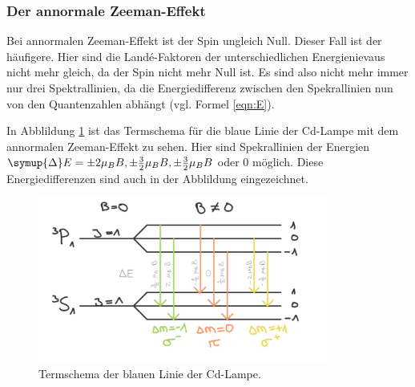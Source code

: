 \subsubsection{Der annormale Zeeman-Effekt}

Bei annormalen Zeeman-Effekt ist der Spin ungleich Null. Dieser Fall ist der häufigere.
Hier sind die Landé-Faktoren der unterschiedlichen Energienievaus nicht mehr gleich, da der Spin nicht mehr Null ist. 
Es sind also nicht mehr immer nur drei Spektrallinien, da die Energiedifferenz zwischen den 
Spekrallinien nun von den Quantenzahlen abhängt (vgl. Formel \ref{eqn:E}). 

In Abblildung \ref{fig:blau} ist das Termschema für die blaue Linie der Cd-Lampe mit dem annormalen 
Zeeman-Effekt zu sehen. Hier sind Spekrallinien der Energien $\symup{\Delta}E = \pm 2 \mu_B B, \pm \frac{3}{2} \mu_B B, \pm \frac{3}{2} \mu_B B$ 
oder $0$ möglich. Diese Energiedifferenzen sind auch in der Abblildung eingezeichnet.

\begin{figure}
  \centering
  \includegraphics[width=0.85\textwidth]{blau2.png}
  \caption{Termschema der blauen Linie der Cd-Lampe.}
  \label{fig:blau}
\end{figure}
\FloatBarrier


